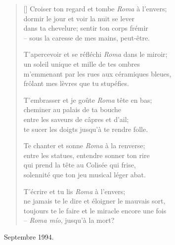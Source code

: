 \documentclass[a4paper,11pt]{article}
\begin{document}


\bigskip

\begin{verse}[\versewidth]
  Croiser ton regard et tombe \emph{Roma} à l'envers; \\
  dormir le jour et voir la nuit se lever \\
  dans ta chevelure; sentir ton corps frémir \\
  -- sous la caresse de mes mains, peut-être.

  T'apercevoir et se réfléchi \emph{Roma} dans le miroir; \\
  un soleil unique et mille de tes ombres \\
  m'emmenant par les rues aux céramiques bleues, \\
  frôlant mes lèvres que tu stupéfies.

  T'embrasser et je goûte \emph{Roma} tête en bas; \\
  cheminer au palais de ta bouche \\
  entre les saveurs de câpres et d'ail; \\
  te sucer les doigts jusqu'à te rendre folle.

  Te chanter et sonne \emph{Roma} à la renverse; \\
  entre les statues, entendre sonner ton rire \\
  qui prend la tête au Colisée qui frise, \\
  solennité que ton jeu musical léger abat.

  T'écrire et tu lis \emph{Roma} à l'envers; \\
  ne jamais te le dire et éloigner le mauvais sort, \\
  toujours te le faire et le miracle encore une fois \\
  -- \emph{Roma mío}, jusqu'à la mort?
\end{verse}

\bigskip \bigskip \qquad Septembre 1994.
\end{document}

